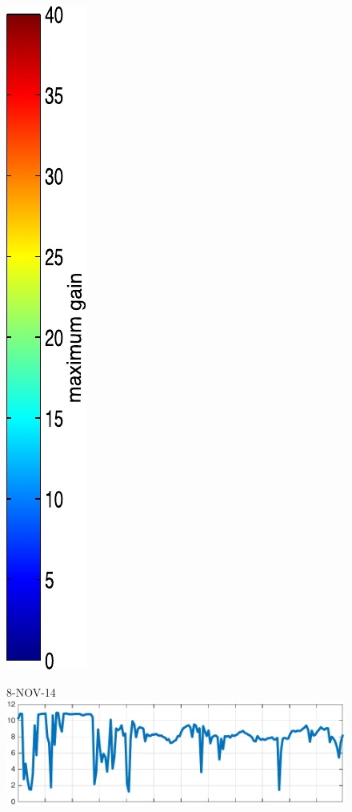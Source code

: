 \begin{figure}
\begin{minipage}[c]{\mylength}
\includegraphics[valign=t,trim=2pt -8pt 0 5pt,width=\colorbarwidth,totalheight=\eventheight]{events/colorbar-40.pdf}
\end{minipage}
\begin{minipage}[c]{\mylength}
\centering \scriptsize 8-NOV-14 \\
\includegraphics[valign=t,trim=0 0 5pt 0,angle=90,origin=tr,width=\sunintwidth,totalheight=\eventheight]{events/20141108-intensity.pdf}

\end{minipage}
\end{figure}
